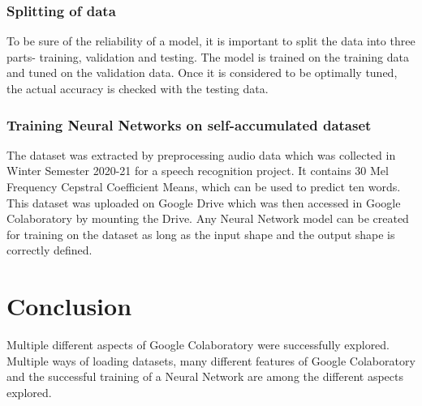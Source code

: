 \documentclass[conference,compsoc]{IEEEtran}
\begin{document}
\subsubsection{Splitting of data}
To be sure of the reliability of a model, it is important to split the data into three parts- training, validation and testing. The model is trained on the training data and tuned on the validation data. Once it is considered to be optimally tuned, the actual accuracy is checked with the testing data.

\subsubsection{Training Neural Networks on self-accumulated dataset}
The dataset was extracted by preprocessing audio data which was collected in Winter Semester 2020-21 for a speech recognition project. It contains 30 Mel Frequency Cepstral Coefficient Means, which can be used to predict ten words. This dataset was uploaded on Google Drive which was then accessed in Google Colaboratory by mounting the Drive. Any Neural Network model can be created for training on the dataset as long as the input shape and the output shape is correctly defined.

\section{Conclusion}
Multiple different aspects of Google Colaboratory were successfully explored. Multiple ways of loading datasets, many different features of Google Colaboratory and the successful training of a Neural Network are among the different aspects explored.
\end{document}
